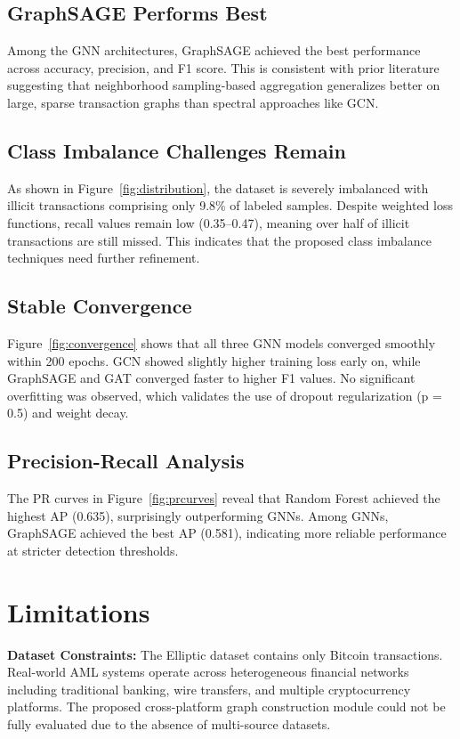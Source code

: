 \documentclass[conference]{IEEEtran}
\begin{document}
\subsection{GraphSAGE Performs Best}
Among the GNN architectures, GraphSAGE achieved the best performance across accuracy, precision, and F1 score. This is consistent with prior literature suggesting that neighborhood sampling-based aggregation generalizes better on large, sparse transaction graphs than spectral approaches like GCN.

\subsection{Class Imbalance Challenges Remain}
As shown in Figure~\ref{fig:distribution}, the dataset is severely imbalanced with illicit transactions comprising only 9.8\% of labeled samples. Despite weighted loss functions, recall values remain low (0.35–0.47), meaning over half of illicit transactions are still missed. This indicates that the proposed class imbalance techniques need further refinement.

\subsection{Stable Convergence}
Figure~\ref{fig:convergence} shows that all three GNN models converged smoothly within 200 epochs. GCN showed slightly higher training loss early on, while GraphSAGE and GAT converged faster to higher F1 values. No significant overfitting was observed, which validates the use of dropout regularization (p = 0.5) and weight decay.

\subsection{Precision-Recall Analysis}
The PR curves in Figure~\ref{fig:prcurves} reveal that Random Forest achieved the highest AP (0.635), surprisingly outperforming GNNs. Among GNNs, GraphSAGE achieved the best AP (0.581), indicating more reliable performance at stricter detection thresholds.

\section{Limitations}

\textbf{Dataset Constraints:} The Elliptic dataset contains only Bitcoin transactions. Real-world AML systems operate across heterogeneous financial networks including traditional banking, wire transfers, and multiple cryptocurrency platforms. The proposed cross-platform graph construction module could not be fully evaluated due to the absence of multi-source datasets.
\end{document}
